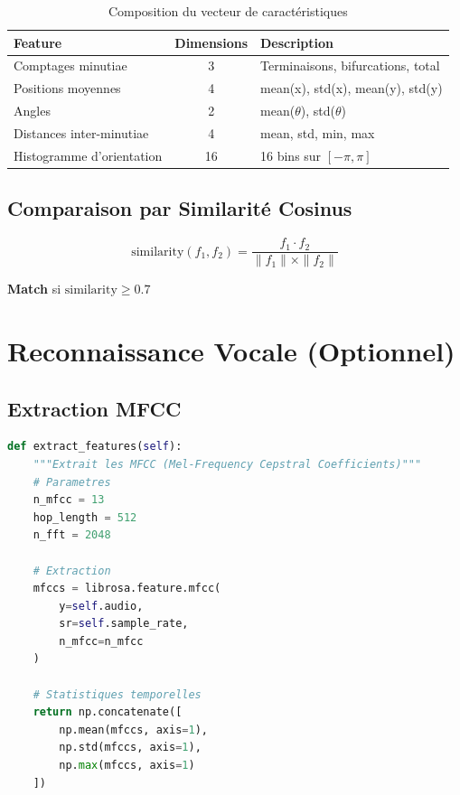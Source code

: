 \documentclass[12pt,a4paper]{report}
\begin{document}
\begin{table}[H]
    \centering
    \caption{Composition du vecteur de caractéristiques}
    \label{tab:features}
    \begin{tabular}{|l|c|l|}
        \hline
        \textbf{Feature} & \textbf{Dimensions} & \textbf{Description} \\
        \hline
        Comptages minutiae & 3 & Terminaisons, bifurcations, total \\
        \hline
        Positions moyennes & 4 & mean(x), std(x), mean(y), std(y) \\
        \hline
        Angles & 2 & mean($\theta$), std($\theta$) \\
        \hline
        Distances inter-minutiae & 4 & mean, std, min, max \\
        \hline
        Histogramme d'orientation & 16 & 16 bins sur $[-\pi, \pi]$ \\
        \hline
    \end{tabular}
\end{table}

\subsection{Comparaison par Similarité Cosinus}

\begin{equation}
    \text{similarity}(f_1, f_2) = \frac{f_1 \cdot f_2}{\|f_1\| \times \|f_2\|}
    \label{eq:cosine}
\end{equation}

\noindent \textbf{Match} si $\text{similarity} \geq 0.7$

\section{Reconnaissance Vocale (Optionnel)}

\subsection{Extraction MFCC}

\begin{lstlisting}[caption={Extraction des caractéristiques vocales},language=Python]
def extract_features(self):
    """Extrait les MFCC (Mel-Frequency Cepstral Coefficients)"""
    # Parametres
    n_mfcc = 13
    hop_length = 512
    n_fft = 2048
    
    # Extraction
    mfccs = librosa.feature.mfcc(
        y=self.audio, 
        sr=self.sample_rate,
        n_mfcc=n_mfcc
    )
    
    # Statistiques temporelles
    return np.concatenate([
        np.mean(mfccs, axis=1),
        np.std(mfccs, axis=1),
        np.max(mfccs, axis=1)
    ])
\end{lstlisting}
\end{document}
